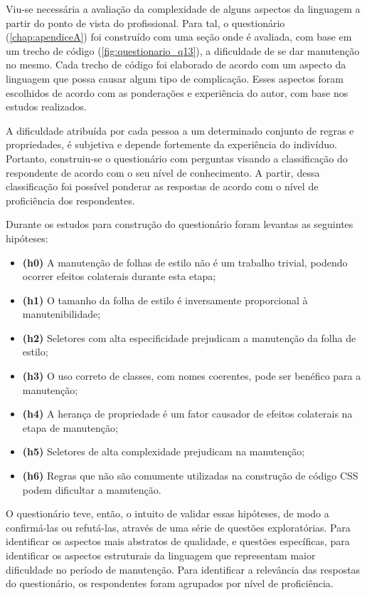 Viu-se necessária a avaliação da complexidade de alguns aspectos da linguagem a partir do ponto de vista do profissional. Para tal, o questionário (\autoref{chap:apendiceA}) foi construído com uma seção onde é avaliada, com base em um trecho de código (\autoref{fig:questionario_q13}), a dificuldade de se dar manutenção no mesmo. Cada trecho de código foi elaborado de acordo com um aspecto da linguagem que possa causar algum tipo de complicação. Esses aspectos foram escolhidos de acordo com as ponderações e experiência do autor, com base nos estudos realizados.

A dificuldade atribuída por cada pessoa a um determinado conjunto de regras e propriedades, é subjetiva e depende fortemente da experiência do indivíduo. Portanto, construiu-se o questionário com perguntas visando a classificação do respondente de acordo com o seu nível de conhecimento. A partir, dessa classificação foi possível ponderar as respostas de acordo com o nível de proficiência dos respondentes.

Durante os estudos para construção do questionário foram levantas as seguintes hipóteses:

\begin{itemize}
	\item \textbf{(h0)} A manutenção de folhas de estilo não é um trabalho trivial, podendo ocorrer efeitos colaterais durante esta etapa;
	\item \textbf{(h1)} O tamanho da folha de estilo é inversamente proporcional à manutenibilidade;
	\item \textbf{(h2)} Seletores com alta especificidade prejudicam a manutenção da folha de estilo;
	\item \textbf{(h3)} O uso correto de classes, com nomes coerentes, pode ser benéfico para a manutenção;
	\item \textbf{(h4)} A herança de propriedade é um fator causador de efeitos colaterais na etapa de manutenção;
	\item \textbf{(h5)} Seletores de alta complexidade prejudicam na manutenção;
	\item \textbf{(h6)} Regras que não são comumente utilizadas na construção de código CSS podem dificultar a manutenção.
\end{itemize}

O questionário teve, então, o intuito de validar essas hipóteses, de modo a confirmá-las ou refutá-las, através de uma série de questões exploratórias. Para identificar os aspectos mais abstratos de qualidade, e questões específicas, para identificar os aspectos estruturais da linguagem que representam maior dificuldade no período de manutenção. Para identificar a relevância das respostas do questionário, os respondentes foram agrupados por nível de proficiência.

